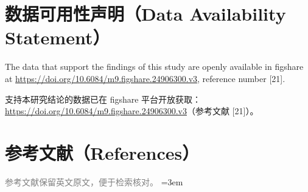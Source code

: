 \documentclass[11pt]{ctexart}
\newenvironment{en}{\begin{enbox}\color{black!85}}{\end{enbox}}
\newenvironment{zh}{\begin{zhbox}}{\end{zhbox}}
\begin{document}
\section*{数据可用性声明（Data Availability Statement）}
\begin{en}
The data that support the findings of this study are openly available in figshare at \url{https://doi.org/10.6084/m9.figshare.24906300.v3}, reference number [21].
\end{en}
\begin{zh}
支持本研究结论的数据已在 figshare 平台开放获取：\url{https://doi.org/10.6084/m9.figshare.24906300.v3}（参考文献 [21]）。
\end{zh}

\section*{参考文献（References）}
\noindent\textcolor{gray}{\small 参考文献保留英文原文，便于检索核对。}
\emergencystretch=3em
\sloppy
\end{document}
